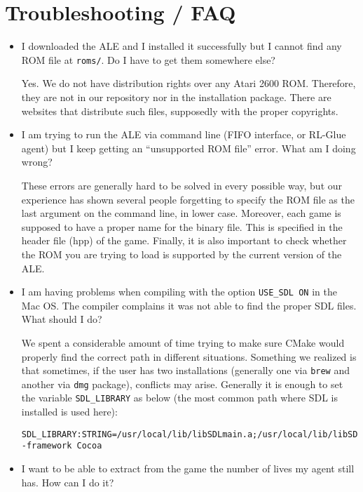 \documentclass[12pt]{article}
\begin{document}
\section{Troubleshooting / FAQ} \label{sec:troubleshooting}

\begin{itemize}
\item I downloaded the ALE and I installed it successfully but I cannot find any ROM file at \verb+roms/+.
Do I have to get them somewhere else?

Yes. We do not have distribution rights over any Atari 2600 ROM. Therefore, they are not in our 
repository nor in the installation package. There are websites that distribute such files, supposedly
with the proper copyrights.

\item I am trying to run the ALE via command line (FIFO interface, or RL-Glue agent) but I keep 
getting an ``unsupported ROM file'' error. What am I doing wrong?

These errors are generally hard to be solved in every possible way, but our experience has shown 
several people forgetting to specify the ROM file as the last argument on the command line, in lower 
case. Moreover, each game is supposed to have a proper name for the binary file. This is specified 
in the header file (hpp) of the game. Finally, it is also important to check whether the ROM you are 
trying to load is supported by  the current  version of the ALE.

\item I am having problems when compiling with the option \verb+USE_SDL ON+ in the Mac OS.
The compiler complains it was not able to find the proper SDL files. What should I do?

We spent a considerable amount of time trying to make sure CMake would properly find the correct 
path in different situations. Something we realized is that sometimes, if the user has two 
installations (generally one via \verb+brew+ and another via \verb+dmg+ package), conflicts may 
arise. Generally it is enough to set the variable \verb+SDL_LIBRARY+ as below (the most common
path where SDL is installed is used here):
\vspace{-0.3cm}
\begin{verbatim}
SDL_LIBRARY:STRING=/usr/local/lib/libSDLmain.a;/usr/local/lib/libSDL.dylib;
-framework Cocoa
\end{verbatim}

\item I want to be able to extract from the game the number of lives my agent still has. How can I do it?


\end{itemize}
\end{document}
